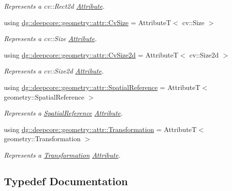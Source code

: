 \begin{DoxyCompactItemize}
\begin{DoxyCompactList}\small\item\em Represents a {\ttfamily cv\+::\+Rect2d} \hyperlink{classdg_1_1deepcore_1_1_attribute}{Attribute}. \end{DoxyCompactList}\item 
using \hyperlink{group___geometry_attributes_gae0e04903bac2efafa10d940b1d5df9ff}{dg\+::deepcore\+::geometry\+::attr\+::\+Cv\+Size} = AttributeT$<$ cv\+::\+Size $>$
\begin{DoxyCompactList}\small\item\em Represents a {\ttfamily cv\+::\+Size} \hyperlink{classdg_1_1deepcore_1_1_attribute}{Attribute}. \end{DoxyCompactList}\item 
using \hyperlink{group___geometry_attributes_ga0e6cae95e97b779779d47e2327f55521}{dg\+::deepcore\+::geometry\+::attr\+::\+Cv\+Size2d} = AttributeT$<$ cv\+::\+Size2d $>$
\begin{DoxyCompactList}\small\item\em Represents a {\ttfamily cv\+::\+Size2d} \hyperlink{classdg_1_1deepcore_1_1_attribute}{Attribute}. \end{DoxyCompactList}\item 
using \hyperlink{group___geometry_attributes_gacd86ea85438c9807d4ab646c9f98a5c1}{dg\+::deepcore\+::geometry\+::attr\+::\+Spatial\+Reference} = AttributeT$<$ geometry\+::\+Spatial\+Reference $>$
\begin{DoxyCompactList}\small\item\em Represents a \hyperlink{classdg_1_1deepcore_1_1geometry_1_1_spatial_reference}{Spatial\+Reference} \hyperlink{classdg_1_1deepcore_1_1_attribute}{Attribute}. \end{DoxyCompactList}\item 
using \hyperlink{group___geometry_attributes_ga0ff2f8043ad91558a37326d1ee3e4331}{dg\+::deepcore\+::geometry\+::attr\+::\+Transformation} = AttributeT$<$ geometry\+::\+Transformation $>$
\begin{DoxyCompactList}\small\item\em Represents a \hyperlink{structdg_1_1deepcore_1_1geometry_1_1_transformation}{Transformation} \hyperlink{classdg_1_1deepcore_1_1_attribute}{Attribute}. \end{DoxyCompactList}\end{DoxyCompactItemize}


\subsection{Typedef Documentation}
